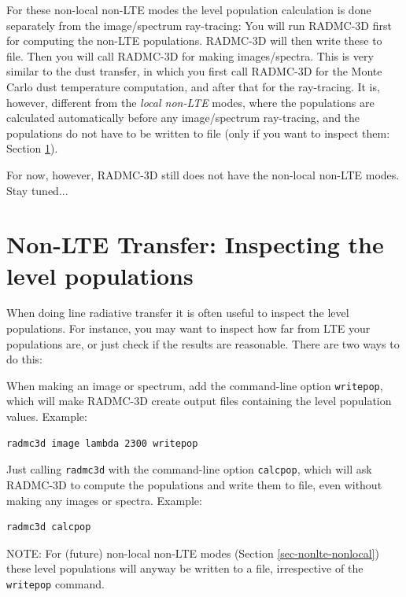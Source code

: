 \documentclass{report}
\newenvironment{asciibox}%
  {\begin{list}{}{%
    \setlength{\topsep}{0.5em}%
    \setlength{\parskip}{0em}%
    \setlength{\parsep}{0em}%
    \setlength{\itemsep}{0em}%
    \setlength{\rightmargin}{0em}%
    \setlength{\leftmargin}{3.0em}%
    \setlength{\labelsep}{1em}%
    \setlength{\labelwidth}{2em}%
  }\normalfont\footnotesize\item}
  {\end{list}}
\begin{document}
For these non-local non-LTE modes the level population calculation is done
separately from the image/spectrum ray-tracing: You will run RADMC-3D first
for computing the non-LTE populations. RADMC-3D will then write these to
file. Then you will call RADMC-3D for making images/spectra. This is very
similar to the dust transfer, in which you first call RADMC-3D for the Monte
Carlo dust temperature computation, and after that for the ray-tracing.  It
is, however, different from the {\em local non-LTE} modes, where the
populations are calculated automatically before any image/spectrum
ray-tracing, and the populations do not have to be written to file (only if
you want to inspect them: Section \ref{sec-nonlte-write-levelpop}).

For now, however, RADMC-3D still does not have the non-local non-LTE
modes. Stay tuned...

\section{Non-LTE Transfer: Inspecting the level populations}
\label{sec-nonlte-write-levelpop}
%
When doing line radiative transfer it is often useful to inspect the level
populations. For instance, you may want to inspect how far from LTE your
populations are, or just check if the results are reasonable.  There are two
ways to do this:
\begin{enumerate}
\item When making an image or spectrum, add the command-line option
{\small\tt writepop}, which will make RADMC-3D create output files
containing the level population values. Example:
\begin{asciibox}\begin{verbatim}
radmc3d image lambda 2300 writepop
\end{verbatim}\end{asciibox}
\item Just calling {\small\tt radmc3d} with the command-line 
option {\small\tt calcpop}, which will ask RADMC-3D to compute the
populations and write them to file, even without making any images
or spectra. Example:
\begin{asciibox}\begin{verbatim}
radmc3d calcpop
\end{verbatim}\end{asciibox}
\end{enumerate}

NOTE: For (future) non-local non-LTE modes (Section
\ref{sec-nonlte-nonlocal}) these level populations will anyway be written to
a file, irrespective of the {\small\tt writepop} command. 
\end{document}
